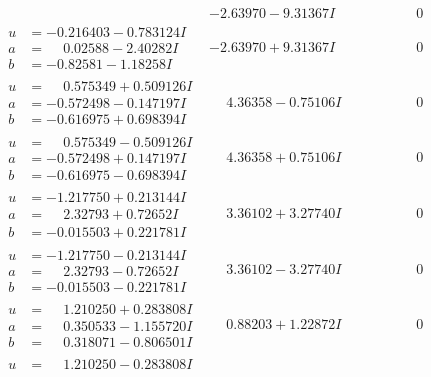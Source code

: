 \documentclass[1p]{elsarticle_modified}
\theoremstyle{definition}
\begin{document}
$$\begin{array}{c|c|c}
 & -2.63970 - 9.31367 I & \phantom{-0.000000 } 0 \\ \hline\begin{aligned}
u &= -0.216403 - 0.783124 I \\
a &= \phantom{-}0.02588 - 2.40282 I \\
b &= -0.82581 - 1.18258 I\end{aligned}
 & -2.63970 + 9.31367 I & \phantom{-0.000000 } 0 \\ \hline\begin{aligned}
u &= \phantom{-}0.575349 + 0.509126 I \\
a &= -0.572498 - 0.147197 I \\
b &= -0.616975 + 0.698394 I\end{aligned}
 & \phantom{-}4.36358 - 0.75106 I & \phantom{-0.000000 } 0 \\ \hline\begin{aligned}
u &= \phantom{-}0.575349 - 0.509126 I \\
a &= -0.572498 + 0.147197 I \\
b &= -0.616975 - 0.698394 I\end{aligned}
 & \phantom{-}4.36358 + 0.75106 I & \phantom{-0.000000 } 0 \\ \hline\begin{aligned}
u &= -1.217750 + 0.213144 I \\
a &= \phantom{-}2.32793 + 0.72652 I \\
b &= -0.015503 + 0.221781 I\end{aligned}
 & \phantom{-}3.36102 + 3.27740 I & \phantom{-0.000000 } 0 \\ \hline\begin{aligned}
u &= -1.217750 - 0.213144 I \\
a &= \phantom{-}2.32793 - 0.72652 I \\
b &= -0.015503 - 0.221781 I\end{aligned}
 & \phantom{-}3.36102 - 3.27740 I & \phantom{-0.000000 } 0 \\ \hline\begin{aligned}
u &= \phantom{-}1.210250 + 0.283808 I \\
a &= \phantom{-}0.350533 - 1.155720 I \\
b &= \phantom{-}0.318071 - 0.806501 I\end{aligned}
 & \phantom{-}0.88203 + 1.22872 I & \phantom{-0.000000 } 0 \\ \hline\begin{aligned}
u &= \phantom{-}1.210250 - 0.283808 I \\

\end{aligned}
\end{array}$$
\end{document}
